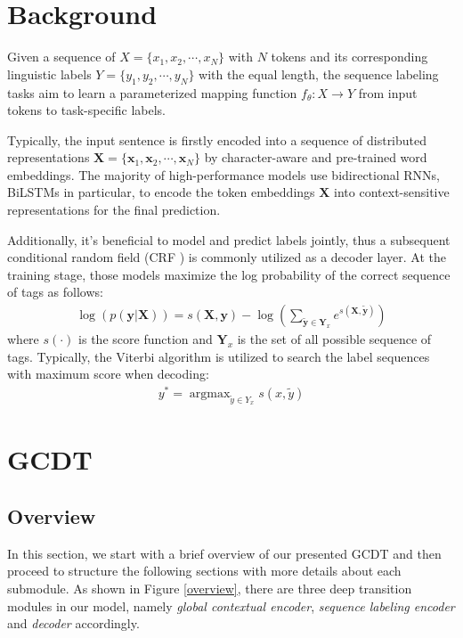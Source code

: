 \documentclass[11pt,a4paper]{article}
\begin{document}
\section{Background}
Given a sequence of $X = \{x_1, x_2, \cdots, x_N \}$ with $N$ tokens and its corresponding linguistic labels $Y = \{y_1, y_2, \cdots, y_N \}$ with the equal length, the sequence labeling tasks aim to learn a parameterized mapping function $f_{\theta} : X
\rightarrow Y $ from input tokens to task-specific labels.

Typically, the input sentence is firstly encoded into a sequence of distributed representations $\mathbf{X} = \{\mathbf{x}_1, \mathbf{x}_2, \cdots, \mathbf{x}_N\}$ by character-aware and pre-trained word embeddings.
The majority of high-performance models use bidirectional RNNs, BiLSTMs in particular, to encode the token embeddings $\mathbf{X}$ into context-sensitive representations for the final prediction. 

Additionally, it's beneficial to model and predict labels jointly, thus a subsequent conditional random field (CRF \citealp{CRF}) is commonly utilized as a decoder layer. At the training stage, those models maximize the log probability of the correct sequence of tags as follows: 
\begin{align}
\log (p (\mathbf{y}|\mathbf{X}) ) = s(\mathbf{X},\mathbf{y}) - \log (\sum_{\widetilde{\mathbf{y}} \in  \mathbf{Y}_x } e ^ { s (\mathbf{X}, \widetilde{\mathbf{y}}) } )
\end{align}
where $s(\cdot)$ is the score function and $\mathbf{Y}_x$ is the set of all possible sequence of tags. Typically, the Viterbi algorithm \cite{viterbi} is utilized to search the label sequences with maximum score when decoding:
\begin{align}
y^{*} = \mathop{\arg\max}_{\widetilde{y} \in Y_x } s (x, \widetilde{y} )
\end{align}

\section{GCDT}

\subsection{Overview}
In this section, we start with a brief overview of our presented GCDT and then proceed to structure the following sections with more details about each submodule. As shown in Figure \ref{overview}, there are three deep transition modules in our model, namely \emph{global contextual encoder}, \emph{sequence labeling encoder} and \emph{decoder} accordingly. 
\end{document}
